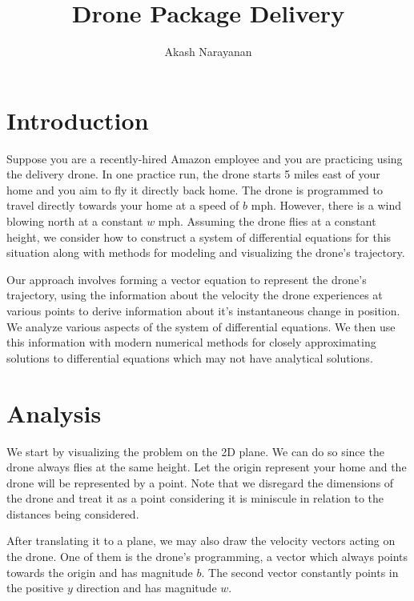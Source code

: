 \documentclass{article}
\title{Drone Package Delivery}
\author{Akash Narayanan}
\date{}
\begin{document}
    \maketitle

    \section{Introduction}
    Suppose you are a recently-hired Amazon employee and you are practicing
    using the delivery drone. In one practice run, the drone starts 5 miles east
    of your home and you aim to fly it directly back home. The drone is
    programmed to travel directly towards your home at a speed of $b$
    mph. However, there is a wind blowing north at a constant $w$ mph.
    Assuming the drone flies at a constant height, we consider how to construct
    a system of differential equations for this situation along with methods for
    modeling and visualizing the drone's trajectory.

    Our approach involves forming a vector equation to represent the drone's
    trajectory, using the information about the velocity the drone experiences
    at various points to derive information about it's instantaneous change in
    position. We analyze various aspects of the system of differential
    equations. We then use this information with modern numerical methods for
    closely approximating solutions to differential equations which may not have
    analytical solutions.

    \section{Analysis}
    We start by visualizing the problem on the 2D plane. We can do so since the
    drone always flies at the same height. Let the origin represent your home
    and the drone will be represented by a point.
    Note that we disregard the dimensions of the drone and treat it as a point
    considering it is miniscule in relation to the distances being considered.

    After translating it to a plane, we may also draw the velocity vectors
    acting on the drone. One of them is the drone's programming, a vector which
    always points towards the origin and has magnitude $b$. The second
    vector constantly points in the positive $y$ direction and has magnitude
    $w$.
\end{document}
